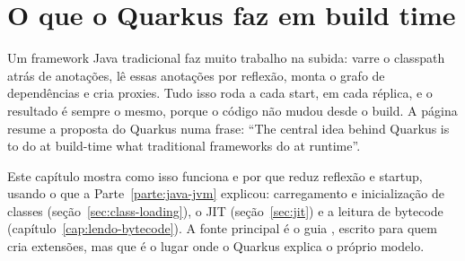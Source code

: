 \chapter{O que o Quarkus faz em build time}
\label{cap:build-time}

\proximasaulas

Um framework Java tradicional faz muito trabalho na subida: varre o
classpath atrás de anotações, lê essas anotações por reflexão, monta o
grafo de dependências e cria proxies. Tudo isso roda a cada start, em
cada réplica, e o resultado é sempre o mesmo, porque o código não mudou
desde o build. A página  resume
a proposta do Quarkus numa frase: \enquote{The central idea behind
Quarkus is to do at build-time what traditional frameworks do at
runtime}.

Este capítulo mostra como isso funciona e por que reduz reflexão e
startup, usando o que a Parte~\ref{parte:java-jvm} explicou: carregamento e inicialização
de classes (seção~\ref{sec:class-loading}), o JIT
(seção~\ref{sec:jit}) e a leitura de bytecode
(capítulo~\ref{cap:lendo-bytecode}). A fonte principal é o guia
, escrito para quem cria
extensões, mas que é o lugar onde o Quarkus explica o próprio modelo.






